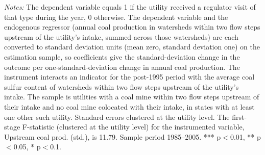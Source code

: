 \begin{table}[htbp]
\begin{minipage}{\linewidth}
\footnotesize
\raggedright
\textit{Notes:} The dependent variable equals 1 if the utility received a regulator visit of that type during the year, 0 otherwise. The dependent variable and the endogenous regressor (annual coal production in watersheds within two flow steps upstream of the utility's intake, summed across those watersheds) are each converted to standard deviation units (mean zero, standard deviation one) on the estimation sample, so coefficients give the standard-deviation change in the outcome per one-standard-deviation change in annual coal production. The instrument interacts an indicator for the post-1995 period with the average coal sulfur content of watersheds within two flow steps upstream of the utility's intake. The sample is utilities with a coal mine within two flow steps upstream of their intake and no coal mine colocated with their intake, in states with at least one other such utility. Standard errors clustered at the utility level. The first-stage F-statistic (clustered at the utility level) for the instrumented variable, Upstream coal prod. (std.), is 11.79. Sample period 1985--2005. *** p$<$0.01, ** p$<$0.05, * p$<$0.1.
\end{minipage}
\end{table}
